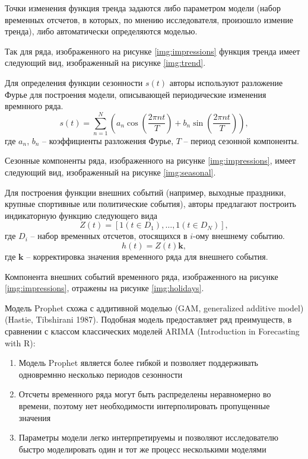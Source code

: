 Точки изменения функция тренда задаются либо параметром модели (набор временных отсчетов, в которых, по мнению
исследователя, произошло измение тренда), либо автоматически определяются моделью. 


Так для ряда, изображенного на рисунке \eqref{img:impressions} функция тренда имеет следующий вид, изображенный
на рисунке \eqref{img:trend}.


Для определения функции сезонности $s(t)$ авторы используют разложение Фурье для построения модели, описывающей
периодические изменения времнного ряда.
\begin{equation}
    s(t) = \sum \limits_{n=1}^N \left( a_n \cos{\left( \dfrac{2\pi n t}{T} \right)} + b_n \sin{\left( \dfrac{2\pi n t}{T} \right)} \right),
\end{equation}
где $a_n$, $b_n$ -- коэффициенты разложения Фурье, $T$ -- период сезонной компоненты.

Сезонные компоненты ряда, изображенного на рисунке \eqref{img:impressions}, имеет следующий вид, изображенный
на рисунке \eqref{img:seasonal}.


Для построения функции внешних событий (например, выходные праздники, крупные спортивные или политические события),
авторы предлагают построить индикаторную функцию следующего вида
\begin{equation}
    Z(t) = \left[ 1 (t \in D_1), \dots, 1 (t \in D_N)\right],
\end{equation}
где $D_i$ -- набор временных отсчетов, отосящихся в $i$-ому внешнему событию.
\begin{equation}
    h(t) = Z(t)\mathbf{k},
\end{equation}
где $\mathbf{k}$ -- корректировка значения временного ряда для внешнего события.

Компонента внешних событий временного ряда, изображенного на рисунке \eqref{img:impressions}, отражены на рисунке 
\eqref{img:holidays}.


Модель Prophet схожа с аддитивной моделью (GAM, generalized additive model) (Hastie, Tibshirani 1987). Подобная модель
предоставляет ряд преимуществ, в сравнении с классом классических моделей ARIMA
(Introduction in Forecasting with R):
\begin{enumerate}
    \item Модель Prophet является более гибкой и позволяет поддерживать одновремнно несколько периодов сезонности
    \item Отсчеты временного ряда могут быть распределены неравномерно во времени, поэтому нет необходимости
    интерполировать пропущенные значения
    \item Параметры модели легко интерпретируемы и позволяют исследователю быстро моделировать один и тот же процесс
    несколькими моделями
\end{enumerate}